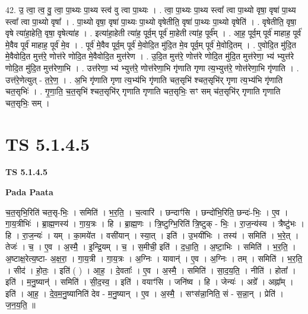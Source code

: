 \documentclass[17pt]{extarticle}
\begin{document}
42. उ॒ त्वा॒ त्व॒ वु॒ त्वा॒ पा॒थ्यः पा॒थ्य स्त्व॑ वु त्वा पा॒थ्यः । . त्वा॒ पा॒थ्यः पा॒थ्य स्त्वा᳚ त्वा पा॒थ्यो वृषा॒ वृषा॑ पा॒थ्य स्त्वा᳚ त्वा पा॒थ्यो वृषा᳚ । . पा॒थ्यो वृषा॒ वृषा॑ पा॒थ्यः पा॒थ्यो वृषेतीति॒ वृषा॑ पा॒थ्यः पा॒थ्यो वृषेति॑ । . वृषेतीति॒ वृषा॒ वृषे त्या॑हा॒हेति॒ वृषा॒ वृषेत्या॑ह । . इत्या॑हा॒हेती त्या॑ह॒ पूर्व॒म् पूर्व॑ मा॒हेती त्या॑ह॒ पूर्व᳚म् । . आ॒ह॒ पूर्व॒म् पूर्व॑ माहाह॒ पूर्व॑ मे॒वैव पूर्व॑ माहाह॒ पूर्व॑ मे॒व । . पूर्व॑ मे॒वैव पूर्व॒म् पूर्व॑ मे॒वोदि॒त मु॑दि॒त मे॒व पूर्व॒म् पूर्व॑ मे॒वोदि॒तम् । . ए॒वोदि॒त मु॑दि॒त मे॒वैवोदि॒त मुत्त॑रे॒ णोत्त॑रे णोदि॒त मे॒वैवोदि॒त मुत्त॑रेण । . उ॒दि॒त मुत्त॑रे॒ णोत्त॑रे णोदि॒त मु॑दि॒त मुत्त॑रेणा॒ भ्य॑ भ्युत्त॑रे णोदि॒त मु॑दि॒त मुत्त॑रेणा॒भि । . उत्त॑रेणा॒ भ्य॑ भ्युत्त॑रे॒ णोत्त॑रेणा॒भि गृ॑णाति गृणा त्य॒भ्युत्त॑रे॒ णोत्त॑रेणा॒भि गृ॑णाति । . उत्त॑रे॒णेत्युत् - त॒रे॒ण॒ । . अ॒भि गृ॑णाति गृणा त्य॒भ्य॑भि गृ॑णाति चत॒सृभि॑ श्चत॒सृभि॑र् गृणा त्य॒भ्य॑भि गृ॑णाति चत॒सृभिः॑ । . गृ॒णा॒ति॒ च॒त॒सृभि॑ श्चत॒सृभि॑र् गृणाति गृणाति चत॒सृभिः॒ सꣳ सम् च॑त॒सृभि॑र् गृणाति गृणाति चत॒सृभिः॒ सम् । \newline
\pagebreak
{}

\section{ TS 5.1.4.5 }

\textbf{TS 5.1.4.5 } \newline

\textbf{Pada Paata} \newline

च॒त॒सृभि॒रिति॑ चत॒सृ-भिः॒ । समिति॑ । भ॒र॒ति॒ । च॒त्वारि॑ । छन्दाꣳ॑सि । छन्दो॑भि॒रिति॒ छन्दः॑-भिः॒ । ए॒व । गा॒य॒त्रीभिः॑ । ब्रा॒ह्म॒णस्य॑ । गा॒य॒त्रः । हि । ब्रा॒ह्म॒णः । त्रि॒ष्टुग्भि॒रिति॑ त्रि॒ष्टुक् - भिः॒ । रा॒ज॒न्य॑स्य । त्रैष्टु॑भः । हि । रा॒ज॒न्यः॑ । यम् । का॒मये॑त । वसी॑यान् । स्या॒त् । इति॑ । उ॒भयी॑भिः । तस्य॑ । समिति॑ । भ॒रे॒त् । तेजः॑ । च॒ । ए॒व । अ॒स्मै॒ । इ॒न्द्रि॒यम् । च॒ । स॒मीची॒ इति॑ । द॒धा॒ति॒ । अ॒ष्टा॒भिः । समिति॑ । भ॒र॒ति॒ । अ॒ष्टाक्ष॒रेत्य॒ष्टा- अ॒क्ष॒रा॒ । गा॒य॒त्री । गा॒य॒त्रः । अ॒ग्निः । यावान्॑ । ए॒व । अ॒ग्निः । तम् । समिति॑ । भ॒र॒ति॒ । सीद॑ । हो॒तः॒ । इति॑ ( ) । आ॒ह॒ । दे॒वताः᳚ । ए॒व । अ॒स्मै॒ । समिति॑ । सा॒द॒य॒ति॒ । नीति॑ । होता᳚ । इति॑ । म॒नु॒ष्यान्॑ । समिति॑ । सी॒द॒स्व॒ । इति॑ । वयाꣳ॑सि । जनि॑ष्व । हि । जेन्यः॑ । अग्रे᳚ । अह्ना᳚म् । इति॑ । आ॒ह॒ । दे॒व॒म॒नु॒ष्यानिति॑ देव - म॒नु॒ष्यान् । ए॒व । अ॒स्मै॒ । सꣳस॑न्ना॒निति॒ सं - स॒न्ना॒न् । प्रेति॑ । ज॒न॒य॒ति॒ ॥  \newline
\end{document}
